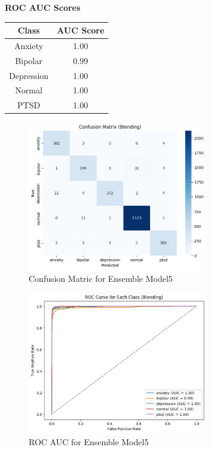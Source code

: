 \begin{center}
    \textbf{ROC AUC Scores} \\[0.5em]
    \begin{tabular}{|c|c|}
        \hline
        \textbf{Class} & \textbf{AUC Score} \\ \hline
        Anxiety        & 1.00 \\ \hline
        Bipolar        & 0.99 \\ \hline
        Depression     & 1.00 \\ \hline
        Normal         & 1.00 \\ \hline
        PTSD           & 1.00 \\ \hline
    \end{tabular}
\end{center}

\begin{figure}[h!]  
    \centering
    \includegraphics[width=0.7\textwidth]{Images/BLD CM.png}  
    \caption{Confusion Matric for Ensemble Model5}
    \label{lstm arch}  %
\end{figure}

\begin{figure}[h!]  
    \centering
    \includegraphics[width=0.7\textwidth]{Images/BLD ROC.png}  
    \caption{ROC AUC for Ensemble Model5}
    \label{lstm arch}  %
\end{figure}

